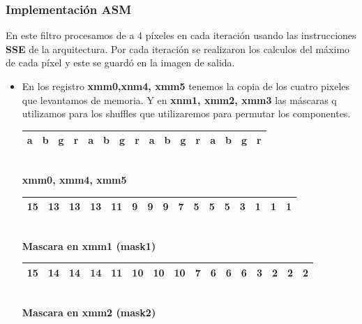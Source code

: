 \subsubsection{Implementación ASM}

En este filtro procesamos de a 4 píxeles en cada iteración usando las instrucciones \textbf{SSE} de la arquitectura. Por cada iteración se realizaron los calculos del máximo de cada píxel y este se guardó en la imagen de salida.

\begin{itemize}

	\item En los registro \textbf{xmm0,xnm4, xmm5} tenemos la copia de los cuatro pixeles que levantamos de memoria.
			Y en \textbf{xnm1, xmm2, xmm3} las máscaras q utilizamos para los shuffles que utilizaremos para permutar los componentes.

		\begin{center}
		   \begin{tabular}{| c | c | c | c || c | c | c | c || c | c | c | c || c | c | c | c |}
			 \hline
			 a & b & g & r & a & b & g & r & a & b & g & r & a & b & g & r \\ \hline

		   \end{tabular}
		   \\ \textbf{xmm0, xmm4, xmm5}
		\end{center}
		 
		\begin{center}
		   \begin{tabular}{| c | c | c | c || c | c | c | c || c | c | c | c || c | c | c | c |}
			 \hline
			 15 & 13 & 13 & 13 & 11 & 9 & 9 & 9 & 7 & 5 & 5 & 5 & 3 & 1 & 1 & 1 \\ \hline
		   \end{tabular}
		   \\  \textbf{Mascara en xmm1 (mask1)}
		\end{center}

		\begin{center}
		   \begin{tabular}{| c | c | c | c || c | c | c | c || c | c | c | c || c | c | c | c |}
			 \hline
			 15 & 14 & 14 & 14 & 11 & 10 & 10 & 10 & 7 & 6 & 6 & 6 & 3 & 2 & 2 & 2 \\ \hline
		   \end{tabular}
		   \\ \textbf{Mascara en xmm2 (mask2)}
		\end{center}


\end{itemize}
